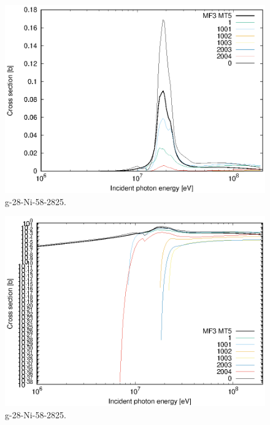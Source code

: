 \begin{figure}
 \includegraphics[width=\linewidth]{eps/g_28-Ni-58_2825.eps}
  \caption{g-28-Ni-58-2825.}
\end{figure}
\begin{figure}
 \includegraphics[width=\linewidth]{eps-log/g_28-Ni-58_2825.eps}
 \caption{g-28-Ni-58-2825.}
\end{figure}
\newpage \clearpage

